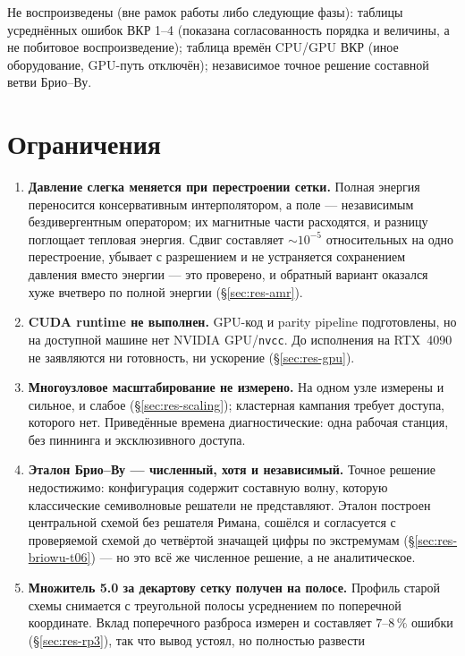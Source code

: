 \documentclass[12pt,a4paper]{article}
\newcommand{\code}[1]{\texttt{#1}}
\begin{document}
Не воспроизведены (вне рамок работы либо следующие фазы): таблицы усреднённых
ошибок ВКР 1--4 (показана согласованность порядка и величины, а не побитовое
воспроизведение); таблица времён CPU/GPU ВКР (иное оборудование, GPU-путь
отключён); независимое точное решение составной ветви Брио--Ву.

\section{Ограничения}
\label{sec:limits}

\begin{enumerate}[nosep]
\item \textbf{Давление слегка меняется при перестроении сетки.} Полная энергия
  переносится консервативным интерполятором, а поле --- независимым
  бездивергентным оператором; их магнитные части расходятся, и разницу поглощает
  тепловая энергия. Сдвиг составляет $\sim10^{-5}$ относительных на одно
  перестроение, убывает с разрешением и не устраняется сохранением давления
  вместо энергии --- это проверено, и обратный вариант оказался хуже вчетверо
  по полной энергии (\S\ref{sec:res-amr}).
\item \textbf{CUDA runtime не выполнен.} GPU-код и parity pipeline подготовлены,
  но на доступной машине нет NVIDIA GPU/\code{nvcc}. До исполнения на RTX~4090
  не заявляются ни готовность, ни ускорение (\S\ref{sec:res-gpu}).
\item \textbf{Многоузловое масштабирование не измерено.} На одном узле измерены
  и сильное, и слабое (\S\ref{sec:res-scaling}); кластерная кампания требует
  доступа, которого нет. Приведённые времена диагностические: одна рабочая
  станция, без пиннинга и эксклюзивного доступа.
\item \textbf{Эталон Брио--Ву --- численный, хотя и независимый.} Точное решение
  недостижимо: конфигурация содержит составную волну, которую классические
  семиволновые решатели не представляют. Эталон построен центральной схемой без
  решателя Римана, сошёлся и согласуется с проверяемой схемой до четвёртой
  значащей цифры по экстремумам (\S\ref{sec:res-briowu-t06}) --- но это всё же
  численное решение, а не аналитическое.
\item \textbf{Множитель 5.0 за декартову сетку получен на полосе.} Профиль
  старой схемы снимается с треугольной полосы усреднением по поперечной
  координате. Вклад поперечного разброса измерен и составляет $7\text{--}8\,\%$
  ошибки (\S\ref{sec:res-rp3}), так что вывод устоял, но полностью развести

\end{enumerate}
\end{document}
